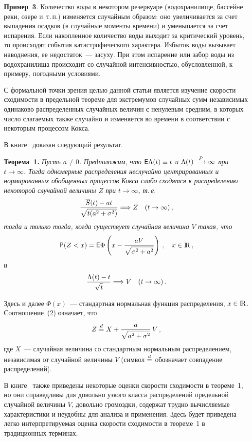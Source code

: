 \begin{multicols}{2}
\noindent
\textbf{Пример~3}. Количество воды в некотором резервуаре
(водохранилище, бассейне реки, озере и~т.\,п.) изменяется случайным
образом: оно увеличивается за счет выпадения осадков (в случайные
моменты времени) и уменьшается за счет испарения. Если накопленное
количество воды выходит за критический уровень, то происходят
события катастрофического характера. Избыток воды вызывает
наводнения, ее недостаток~--- засуху. При этом испарение или забор
воды из водохранилища происходит со случайной интенсивностью,
обусловленной, к примеру, погодными условиями.

\smallskip

С формальной точки зрения целью данной \mbox{статьи} является изучение
скорости сходимости в предельной теореме для экстремумов случайных
сумм независимых одинаково распределенных случайных величин с
ненулевым средним, в которых число слагаемых также случайно и
изменяется во времени в соответствии с некоторым процессом Кокса.

В книге~\cite{1a} доказан следующий результат.

\smallskip

\noindent
\textbf{Теорема~1.} {\it Пусть $a\neq0$. Предположим, что ${\sf
E}\Lambda(t) \equiv t$ и $\Lambda(t)\stackrel{P}{\longrightarrow}\infty$ при $t\to\infty$.
Тогда одномерные распределения неслучайно центрированных и
нормированных обобщенных процессов Кокса слабо сходятся к
распределению некоторой случайной величины $Z$ при $t\to\infty$,
т.\,е.\
$$
\displaystyle\frac{\displaystyle \overline{S}(t)-at\mathstrut}{\displaystyle \sqrt{t(a^2+\sigma^2)}\mathstrut}\Longrightarrow
Z\quad (t\to\infty)\,,
$$
тогда и только тогда, когда существует случайная величина $V$
такая, что
\begin{equation}
{\sf P}(Z<x)={\sf
E}\Phi\left(x-\displaystyle\frac{\displaystyle aV\mathstrut}{\displaystyle \sqrt{\sigma^2+a^2}\mathstrut}\right)\,,\quad
x\in \mathrm{I}\hspace*{-0.7mm}\mathrm{R}\,,
\label{e2a}
\end{equation}
и}
$$\displaystyle\frac{\displaystyle \Lambda(t)-t\mathstrut}{\displaystyle \sqrt t\mathstrut}\Longrightarrow V\quad 
(t\to\infty)\,.
$$

\smallskip

\noindent 
Здесь и далее $\Phi(x)$~--- стандартная нормальная
функция распределения, $x\in{\rm I\hspace{-0.7mm}\rm R}$. Соотношение~(2) означает, что
$$
Z\stackrel{d}{=} X+\displaystyle\frac{\displaystyle a\mathstrut}{\displaystyle \sqrt{a^2+\sigma^2}\mathstrut}\, V\,,
$$
где $X$~--- случайная величина со стандартным нормальным
распределением, независимая от случайной величины $V$ (символ
$\stackrel{d}{=}$ обозначает совпадение распределений).

В книге~\cite{1a} также приведены некоторые оценки скорости сходимости в
теореме~1, но они справедливы для довольно узкого класса
распределений предельной случайной величины $V$, довольно
громоздки, содержат трудно вычисляемые характеристики и неудобны
для анализа и применения. Здесь будет приведена легко
интерпретируемая оценка скорости сходимости в теореме~1 в
традиционных терминах.


\end{multicols}
